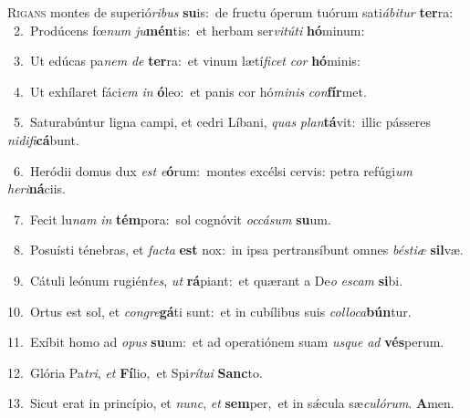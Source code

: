 \lettrine{\initial\textcolor{\initialcolor}{R}}{igans} montes de superió\-\textit{ri}\-\textit{bus} \textbf{su}\-is:~\star de fructu óperum tuórum sati\-\textit{á}\-\textit{bi}\textit{tur} \textbf{ter}\-ra:\\
{\numbfont\textcolor{\numbcolor}{~2.}}~Prodúcens fœ\textit{num} \textit{ju}\-\textbf{mén}tis:~\star et herbam ser\-\textit{vi}\-\textit{tú}\textit{ti} \textbf{hó}\-minum:\par
{\numbfont\textcolor{\numbcolor}{~3.}}~Ut edúcas pa\textit{nem} \textit{de} \textbf{ter}\-ra:~\star et vinum lætí\-\textit{fi}\-\textit{cet} \textit{cor} \textbf{hó}\-minis:\par
{\numbfont\textcolor{\numbcolor}{~4.}}~Ut exhílaret fáci\textit{em} \textit{in} \textbf{ó}\-leo:~\star et panis cor hó\-\textit{mi}\-\textit{nis} \textit{con}\-\textbf{fír}met.\par
{\numbfont\textcolor{\numbcolor}{~5.}}~Saturabúntur ligna campi, et cedri Líbani, \textit{quas} \textit{plan}\-\textbf{tá}vit:~\star illic pásseres \textit{ni}\-\textit{di}\textit{fi}\textbf{cá}bunt.\par
{\numbfont\textcolor{\numbcolor}{~6.}}~Heródii domus dux \textit{est} \textit{e}\-\textbf{ó}rum:~\star montes excélsi cervis: petra refúgi\textit{um} \textit{he}\-\textit{ri}\textbf{ná}ciis.\par
{\numbfont\textcolor{\numbcolor}{~7.}}~Fecit lu\textit{nam} \textit{in} \textbf{tém}\-pora:~\star sol cognóvit \textit{oc}\-\textit{cá}\textit{sum} \textbf{su}\-um.\par
{\numbfont\textcolor{\numbcolor}{~8.}}~Posuísti ténebras, et \textit{fac}\-\textit{ta} \textbf{est} nox:~\star in ipsa pertransíbunt omnes \textit{bés}\-\textit{ti}\textit{æ} \textbf{sil}\-væ.\par
{\numbfont\textcolor{\numbcolor}{~9.}}~Cátuli leónum rugién\-\textit{tes}\-, \textit{ut} \textbf{rá}\-piant:~\star et quærant a De\textit{o} \textit{es}\-\textit{cam} \textbf{si}\-bi.\par
{\numbfont\textcolor{\numbcolor}{10.}}~Ortus est sol, et \textit{con}\-\textit{gre}\textbf{gá}ti sunt:~\star et in cubílibus suis \textit{col}\-\textit{lo}\textit{ca}\textbf{bún}tur.\par
{\numbfont\textcolor{\numbcolor}{11.}}~Exíbit homo ad \textit{o}\-\textit{pus} \textbf{su}\-um:~\star et ad operatiónem suam \textit{us}\-\textit{que} \textit{ad} \textbf{vés}\-perum.\par
{\numbfont\textcolor{\numbcolor}{12.}}~Glória Pa\-\textit{tri}\-, \textit{et} \textbf{Fí}\-lio,~\star et Spi\-\textit{rí}\-\textit{tu}\textit{i} \textbf{Sanc}\-to.\par
{\numbfont\textcolor{\numbcolor}{13.}}~Sicut erat in princípio, et \textit{nunc}\-, \textit{et} \textbf{sem}\-per,~\star et in sǽcula sæ\-\textit{cu}\-\textit{ló}\textit{rum}. \textbf{A}\-men.\par
